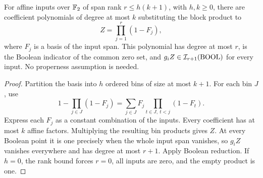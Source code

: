 \begin{lemma}\label{lem:packing}
For affine inputs over \(\mathbb F_2\) of span rank \(r\le h(k+1)\), with
\(h,k\ge0\), there are coefficient polynomials of degree at most \(k\)
substituting the block product to
\[
 Z=\prod_{j=1}^r(1-F_j),
\]
where \(F_j\) is a basis of the input span. This polynomial has degree
at most \(r\), is the Boolean indicator of the common zero set, and
\(g_iZ\in\mathcal I_{r+1}(\operatorname{BOOL})\) for every input. No properness assumption
is needed.
\end{lemma}
\begin{proof}
Partition the basis into \(h\) ordered bins of size at most \(k+1\).
For each bin \(J\), use
\[
 1-\prod_{j\in J}(1-F_j)
   =\sum_{j\in J} F_j\prod_{t\in J,\ t<j}(1-F_t).
\]
Express each \(F_j\) as a constant combination of the inputs. Every
coefficient has at most \(k\) affine factors. Multiplying the resulting
bin products gives \(Z\). At every Boolean point it is one precisely
when the whole input span vanishes, so \(g_iZ\) vanishes everywhere and
has degree at most \(r+1\). Apply Boolean reduction. If \(h=0\), the
rank bound forces \(r=0\), all inputs are zero, and the empty product is one.
\end{proof}

